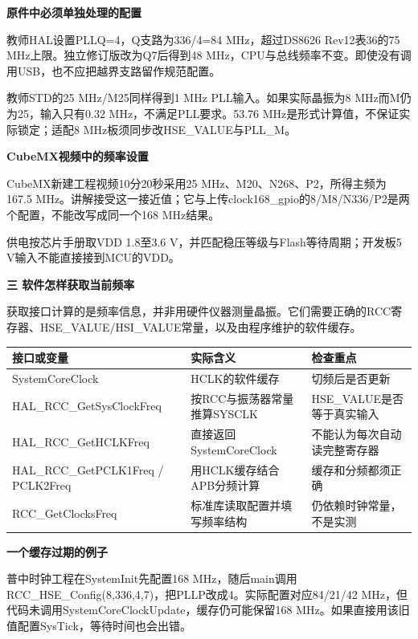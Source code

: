 \documentclass[10pt,a4paper]{article}
\newcommand{\qtitle}[1]{{\Large\bfseries #1}\par\vspace{4pt}}
\newcommand{\qsub}[1]{{\bfseries #1}\par}
\begin{document}
\qsub{原件中必须单独处理的配置}
教师HAL设置PLLQ=4，Q支路为336/\allowbreak{}4=84 MHz，超过DS8626 Rev12表36的75 MHz上限。独立修订版改为Q7后得到48 MHz，CPU与总线频率不变。即使没有调用USB，也不应把越界支路留作规范配置。

教师STD的25 MHz/\allowbreak{}M25同样得到1 MHz PLL输入。如果实际晶振为8 MHz而M仍为25，输入只有0.32 MHz，不满足PLL要求。53.76 MHz是形式计算值，不保证实际锁定；适配8 MHz板须同步改HSE\_\allowbreak{}VALUE与PLL\_\allowbreak{}M。

\qsub{CubeMX视频中的频率设置}
CubeMX新建工程视频10分20秒采用25 MHz、M20、N268、P2，所得主频为167.5 MHz。讲解接受这一接近值；它与上传clock168\_\allowbreak{}gpio的8/\allowbreak{}M8/\allowbreak{}N336/\allowbreak{}P2是两个配置，不能改写成同一个168 MHz结果。

供电按芯片手册取VDD 1.8至3.6 V，并匹配稳压等级与Flash等待周期；开发板5 V输入不能直接接到MCU的VDD。


\clearpage
{}
\qtitle{三 软件怎样获取当前频率}
获取接口计算的是频率信息，并非用硬件仪器测量晶振。它们需要正确的RCC寄存器、HSE\_\allowbreak{}VALUE/\allowbreak{}HSI\_\allowbreak{}VALUE常量，以及由程序维护的软件缓存。

\begingroup\small
\begin{tabularx}{\linewidth}{|>{\hsize}Y|>{\hsize}Y|>{\hsize}Y|}\hline
{}
\textbf{接口或变量} & \textbf{实际含义} & \textbf{检查重点} \\ \hline
SystemCoreClock & HCLK的软件缓存 & 切频后是否更新 \\ \hline
HAL\_\allowbreak{}RCC\_\allowbreak{}GetSysClockFreq & 按RCC与振荡器常量推算SYSCLK & HSE\_\allowbreak{}VALUE是否等于真实输入 \\ \hline
HAL\_\allowbreak{}RCC\_\allowbreak{}GetHCLKFreq & 直接返回SystemCoreClock & 不能认为每次自动读完整寄存器 \\ \hline
HAL\_\allowbreak{}RCC\_\allowbreak{}GetPCLK1Freq /\allowbreak{} PCLK2Freq & 用HCLK缓存结合APB分频计算 & 缓存和分频都须正确 \\ \hline
RCC\_\allowbreak{}GetClocksFreq & 标准库读取配置并填写频率结构 & 仍依赖时钟常量，不是实测 \\ \hline
\end{tabularx}
\endgroup\par
\qsub{一个缓存过期的例子}
普中时钟工程在SystemInit先配置168 MHz，随后main调用RCC\_\allowbreak{}HSE\_\allowbreak{}Config(8,336,4,7)，把PLLP改成4。实际配置对应84/\allowbreak{}21/\allowbreak{}42 MHz，但代码未调用SystemCoreClockUpdate，缓存仍可能保留168 MHz。如果直接用该旧值配置SysTick，等待时间也会出错。
\end{document}

